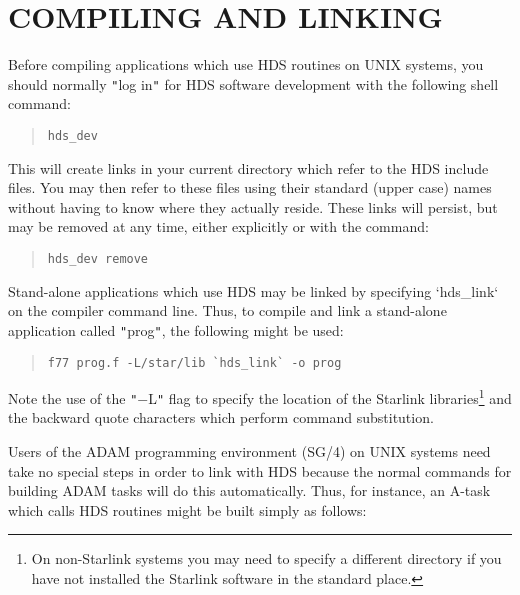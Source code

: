 \documentclass[11pt]{article}
\newcommand{\htmlref}[2]{#1}
\newcommand{\xref}[3]{#1}
\newcommand{\xlabel}[1]{}
\newcommand{\qt}[1]{``#1''}
\renewcommand{\qt}[1]{{\tt{"}}#1{\tt{"}}}
\begin{document}
\section{\xlabel{compiling_and_linking}COMPILING AND LINKING}

Before compiling applications which use HDS
\htmlref{routines}{appendix:alphalist} on UNIX systems, you should
normally \qt{log in} for HDS software development with the following
shell command:

\small
\begin{quote}
\begin{verbatim}
hds_dev
\end{verbatim}
\end{quote}
\normalsize

This will create links in your current directory which refer to the
HDS include files. You may then refer to these files using their
standard (upper case) names without having to know where they actually
reside. These links will persist, but may be removed at any time,
either explicitly or with the command:

\small
\begin{quote}
\begin{verbatim}
hds_dev remove
\end{verbatim}
\end{quote}
\normalsize

Stand-alone applications which use HDS may be linked by specifying
`hds\_link` on the compiler command line. Thus, to compile and link a
stand-alone application called \qt{prog}, the following might be used:

\small
\begin{quote}
\begin{verbatim}
f77 prog.f -L/star/lib `hds_link` -o prog
\end{verbatim}
\end{quote}
\normalsize

Note the use of the \qt{$-$L} flag to specify the location of the
Starlink libraries\footnote{On non-Starlink systems you may need to
specify a different directory if you have not installed the Starlink
software in the standard place.} and the backward quote characters
which perform command substitution.

Users of the ADAM programming environment (\xref{SG/4}{sg4}{}) on UNIX
systems need take no special steps in order to link with HDS because
the normal commands for building ADAM tasks will do this
automatically. Thus, for instance, an A-task which calls HDS routines
might be built simply as follows:
\end{document}
